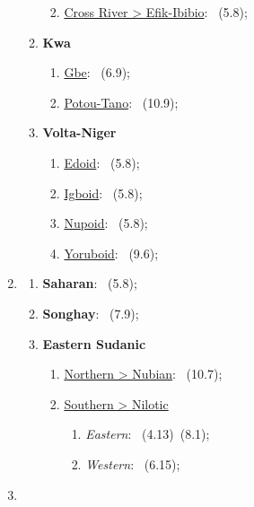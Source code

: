 \begin{enumerate}
\begin{enumerate}
\begin{enumerate}
\begin{enumerate}
            \end{enumerate}
            \item \uline{Cross River > Efik-Ibibio}: \langnameIbibio\ (5.8);
        \end{enumerate}
        \item \textbf{Kwa}
        \begin{enumerate}
            \item \uline{Gbe}: \langnameGee\ (6.9);
            \item \uline{Potou-Tano}: \langnameAkan\ (10.9);
        \end{enumerate}
        \item \textbf{Volta-Niger}
        \begin{enumerate}
            \item \uline{Edoid}: \langnameUrhobo\ (5.8);
            \item \uline{Igboid}: \langnameIbo\ (5.8);
            \item \uline{Nupoid}: \langnameNupe\ (5.8);
            \item \uline{Yoruboid}: \langnameYoruba\ (9.6);
        \end{enumerate}
    \end{enumerate}
    \item \MakeUppercase{\textbf{\langfamily{\famNiloSaharan}}}
    \begin{enumerate}
        \item \textbf{Saharan}: \langnameDaza\ (5.8);
        \item \textbf{Songhay}: \langnameTadaksahak\ (7.9);
        \item \textbf{Eastern Sudanic}
        \begin{enumerate}
            \item \uline{Northern > Nubian}: \langnameTabaq\ (10.7);
            \item \uline{Southern > Nilotic}
            \begin{enumerate}
                \item \textit{Eastern}: \langnameBari\ (4.13)\EnumComma\langnameLango\ (8.1);
                \item \textit{Western}: \langnameDinka\ (6.15);
            \end{enumerate}
        \end{enumerate}
    \end{enumerate}
    \item \MakeUppercase{\textbf{\langfamily{\famNECaucasian}}}

\end{enumerate}
